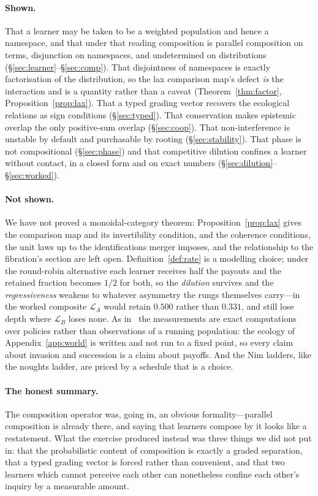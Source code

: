 \documentclass[11pt,a4paper]{article}
\theoremstyle{plain}
\theoremstyle{definition}
\theoremstyle{remark}
\newcommand{\Lrn}{\mathcal{L}}
\begin{document}
\paragraph{Shown.}
That a learner may be taken to be a weighted population and hence a namespace, and that under
that reading composition is parallel composition on terms, disjunction on namespaces, and
undetermined on distributions (\S\ref{sec:learner}--\S\ref{sec:comp}). That disjointness of
namespaces is exactly factorisation of the distribution, so the lax comparison map's defect
\emph{is} the interaction and is a quantity rather than a caveat (Theorem~\ref{thm:factor},
Proposition~\ref{prop:lax}). That a typed grading vector recovers the ecological relations as
sign conditions (\S\ref{sec:typed}). That conservation makes epistemic overlap the only
positive-sum overlap (\S\ref{sec:coop}). That non-interference is unstable by default and
purchasable by rooting (\S\ref{sec:stability}). That phase is not compositional
(\S\ref{sec:phase}) and that competitive dilution confines a learner without contact, in a closed
form and on exact numbers (\S\ref{sec:dilution}--\S\ref{sec:worked}).

\paragraph{Not shown.}
We have not proved a monoidal-category theorem: Proposition~\ref{prop:lax} gives the comparison
map and its invertibility condition, and the coherence conditions, the unit laws up to the
identifications merger imposes, and the relationship to the fibration's section are left open.
Definition~\ref{def:rate} is a modelling choice; under the round-robin alternative each learner
receives half the payouts and the retained fraction becomes $1/2$ for both, so the
\emph{dilution} survives and the \emph{regressiveness} weakens to whatever asymmetry the rungs
themselves carry---in the worked composite $\Lrn_A$ would retain $0.500$ rather than $0.331$, and
still lose depth where $\Lrn_B$ loses none. As in~\cite{game} the measurements are exact
computations over policies rather than observations of a running population: the ecology of
Appendix~\ref{app:world} is written and not run to a fixed point, so every claim about invasion
and succession is a claim about payoffs. And the Nim ladders, like the noughts ladder, are
priced by a schedule that is a choice.

\paragraph{The honest summary.}
The composition operator was, going in, an obvious formality---parallel composition is already
there, and saying that learners compose by it looks like a restatement. What the exercise
produced instead was three things we did not put in: that the probabilistic content of
composition is exactly a graded separation, that a typed grading vector is forced rather than
convenient, and that two learners which cannot perceive each other can nonetheless confine each
other's inquiry by a measurable amount.
\end{document}
